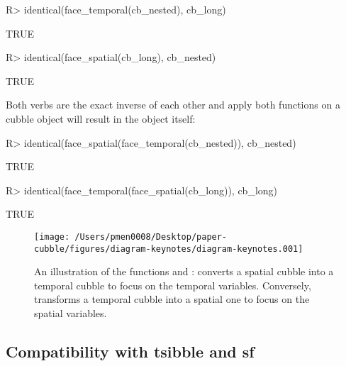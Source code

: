 \documentclass[
  shortnames]{jss}
\begin{document}
\begin{CodeChunk}
\begin{CodeInput}
R> identical(face_temporal(cb_nested), cb_long)
\end{CodeInput}
\begin{CodeOutput}
[1] TRUE
\end{CodeOutput}
\begin{CodeInput}
R> identical(face_spatial(cb_long), cb_nested)
\end{CodeInput}
\begin{CodeOutput}
[1] TRUE
\end{CodeOutput}
\end{CodeChunk}

Both verbs are the exact inverse of each other and apply both functions on a cubble object will result in the object itself:

\begin{CodeChunk}
\begin{CodeInput}
R> identical(face_spatial(face_temporal(cb_nested)), cb_nested)
\end{CodeInput}
\begin{CodeOutput}
[1] TRUE
\end{CodeOutput}
\begin{CodeInput}
R> identical(face_temporal(face_spatial(cb_long)), cb_long)
\end{CodeInput}
\begin{CodeOutput}
[1] TRUE
\end{CodeOutput}
\end{CodeChunk}

\begin{CodeChunk}
\begin{figure}

{\centering \texttt{[image: /Users/pmen0008/Desktop/paper-cubble/figures/diagram-keynotes/diagram-keynotes.001]} 

}

\caption{An illustration of the functions  and :  converts a spatial cubble into a temporal cubble to focus on the temporal variables. Conversely,  transforms a temporal cubble into a spatial one to focus on the spatial variables.}\label{fig:face}
\end{figure}
\end{CodeChunk}

\hypertarget{compatibility-with-tsibble-and-sf}{%
\subsection{Compatibility with tsibble and sf}\label{compatibility-with-tsibble-and-sf}}
\end{document}

